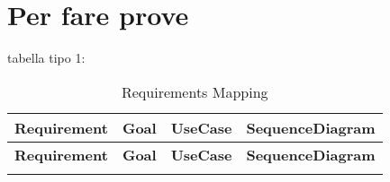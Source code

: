 \chapter{Per fare prove}


tabella tipo 1:

\begin{longtable}{cccc}
    \caption{Requirements Mapping} \\
    \toprule
    \textbf{Requirement} & \textbf{Goal} & \textbf{UseCase} & \textbf{SequenceDiagram} \\
    \midrule
    \endfirsthead
    
    \toprule
    \textbf{Requirement} & \textbf{Goal} & \textbf{UseCase} & \textbf{SequenceDiagram} \\
    \midrule
    \endhead
    
    \bottomrule
    \endfoot
    

\end{longtable}
